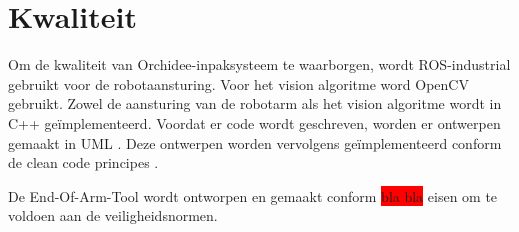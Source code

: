 \section{Kwaliteit}

Om de kwaliteit van Orchidee-inpaksysteem te waarborgen, wordt ROS-industrial gebruikt voor de robotaansturing.
Voor het vision algoritme word OpenCV gebruikt.
Zowel de aansturing van de robotarm als het vision algoritme wordt in C++ geïmplementeerd.
Voordat er code wordt geschreven, worden er ontwerpen gemaakt in UML \cite{UML}.
Deze ontwerpen worden vervolgens geïmplementeerd conform de clean code principes \cite{CLEAN_CODE}.

De End-Of-Arm-Tool wordt ontworpen en gemaakt conform \colorbox{red}{bla bla} eisen om te voldoen aan de veiligheidsnormen.

\newpage